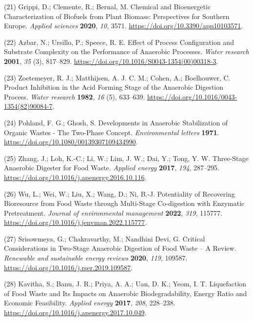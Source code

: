 \documentclass[11pt]{report}
\begin{document}
\hypertarget{citeproc_bib_item_21}{(21) Grippi, D.; Clemente, R.; Bernal, M. Chemical and Bioenergetic Characterization of Biofuels from Plant Biomass: Perspectives for Southern Europe. \textit{Applied sciences} \textbf{2020}, \textit{10}, 3571. \url{https://doi.org/10.3390/app10103571}.}

\hypertarget{citeproc_bib_item_22}{(22) Azbar, N.; Ursillo, P.; Speece, R. E. Effect of Process Configuration and Substrate Complexity on the Performance of Anaerobic Processes. \textit{Water research} \textbf{2001}, \textit{35} (3), 817–829. \url{https://doi.org/10.1016/S0043-1354(00)00318-3}.}

\hypertarget{citeproc_bib_item_23}{(23) Zoetemeyer, R. J.; Matthijsen, A. J. C. M.; Cohen, A.; Boelhouwer, C. Product Inhibition in the Acid Forming Stage of the Anaerobic Digestion Process. \textit{Water research} \textbf{1982}, \textit{16} (5), 633–639. \url{https://doi.org/10.1016/0043-1354(82)90084-7}.}

\hypertarget{citeproc_bib_item_24}{(24) Pohland, F. G.; Ghosh, S. Developments in Anaerobic Stabilization of Organic Wastes - The Two-Phase Concept. \textit{Environmental letters} \textbf{1971}. \url{https://doi.org/10.1080/00139307109434990}.}

\hypertarget{citeproc_bib_item_25}{(25) Zhang, J.; Loh, K.-C.; Li, W.; Lim, J. W.; Dai, Y.; Tong, Y. W. Three-Stage Anaerobic Digester for Food Waste. \textit{Applied energy} \textbf{2017}, \textit{194}, 287–295. \url{https://doi.org/10.1016/j.apenergy.2016.10.116}.}

\hypertarget{citeproc_bib_item_26}{(26) Wu, L.; Wei, W.; Liu, X.; Wang, D.; Ni, B.-J. Potentiality of Recovering Bioresource from Food Waste through Multi-Stage Co-digestion with Enzymatic Pretreatment. \textit{Journal of environmental management} \textbf{2022}, \textit{319}, 115777. \url{https://doi.org/10.1016/j.jenvman.2022.115777}.}

\hypertarget{citeproc_bib_item_27}{(27) Srisowmeya, G.; Chakravarthy, M.; Nandhini Devi, G. Critical Considerations in Two-Stage Anaerobic Digestion of Food Waste – A Review. \textit{Renewable and sustainable energy reviews} \textbf{2020}, \textit{119}, 109587. \url{https://doi.org/10.1016/j.rser.2019.109587}.}

\hypertarget{citeproc_bib_item_28}{(28) Kavitha, S.; Banu, J. R.; Priya, A. A.; Uan, D. K.; Yeom, I. T. Liquefaction of Food Waste and Its Impacts on Anaerobic Biodegradability, Energy Ratio and Economic Feasibility. \textit{Applied energy} \textbf{2017}, \textit{208}, 228–238. \url{https://doi.org/10.1016/j.apenergy.2017.10.049}.}
\end{document}
